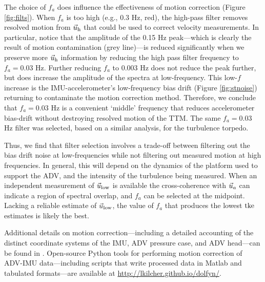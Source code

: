 The choice of $f_a$ does influence the effectiveness of motion correction (Figure \ref{fig:filts}). When $f_a$ is too high (e.g., 0.3  Hz, red), the high-pass filter removes resolved motion from $\uhead$ that could be used to correct velocity measurements. In particular, notice that the amplitude of the 0.15 Hz peak---which is clearly the result of motion contamination (grey line)---is reduced significantly when we preserve more $\uhead$ information by reducing the high pass filter frequency to $f_a = 0.03$ Hz. Further reducing $f_a$ to $0.003$ Hz does not reduce the peak further, but does increase the amplitude of the spectra at low-frequency. This low-$f$ increase is the IMU-accelerometer's low-frequency bias drift (Figure \ref{fig:stnoise}) returning to contaminate the motion correction method. Therefore, we conclude that $f_a = 0.03$ Hz is a convenient `middle' frequency that reduces accelerometer bias-drift without destroying resolved motion of the TTM.  The same $f_a=0.03$ Hz filter was selected, based on a similar analysis, for the turbulence torpedo. 

Thus, we find that filter selection involves a trade-off between filtering out the bias drift noise at low-frequencies while not filtering out measured motion at high frequencies. In general, this will depend on the dynamics of the platform used to support the ADV, and the intensity of the turbulence being measured. When an independent measurement of $\ulow$ is available the cross-coherence with $\uacc$ can indicate a region of spectral overlap, and $f_a$ can be selected at the midpoint. Lacking a reliable estimate of $\ulow$,  the value of $f_a$ that produces the lowest $\mathrm{tke}$ estimates is likely the best. 

Additional details on motion correction---including a detailed accounting of the distinct coordinate systems of the IMU, ADV pressure case, and ADV head---can be found in \cite{Kilcher++2016}. Open-source Python tools for performing motion correction of ADV-IMU data---including scripts that write processed data in Matlab and tabulated formats---are available at \url{http://lkilcher.github.io/dolfyn/}.

\def\ue{\ensuremath{\vec{u}\earth}}

